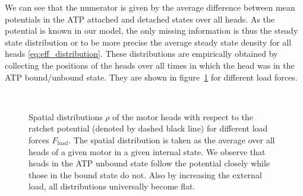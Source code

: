 \documentclass[aps,pre,twocolumn,showpacs,showkeys,superscriptaddress,floatfix]{revtex4-1}
\begin{document}
We can see that the numerator is given by the average difference between mean potentials in the ATP attached and detached states over all heads. 
As the potential is known in our model, the only missing information is thus the steady state distribution 
or to be more precise the average steady state density for all heads \eqref{eq:eff_distribution}.  
These distributions are empirically obtained by collecting the positions of the heads over all times in which the head was in the ATP bound/unbound state.
They are shown in figure~\ref{fig:pos_distr} for different load forces. 
\begin{figure}[t]
\centering
{}
\\
\caption{
\label{fig:pos_distr}
Spatial distributions $\rho$ of the motor heads with respect to the ratchet potential (denoted by dashed black line) for different load forces $F_\text{load}$.
The spatial distribution is taken as the average over all heads of a given motor in a given internal state.
We observe that heads in the ATP unbound state follow the potential closely while those in the bound state do not. 
Also by increasing the external load, all distributions universally become flat. 
}
\end{figure}
\end{document}
